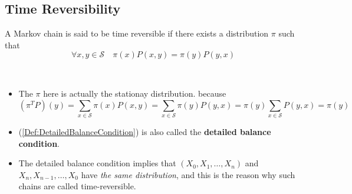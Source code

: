     \subsection{Time Reversibility}
        \begin{definition}
            A Markov chain is said to be time reversible if there exists a distribution $\pi$ such that
            \begin{equation}\label{Def:DetailedBalanceCondition}
                \forall x,y \in \mathcal{S} \quad \pi(x)P(x,y) = \pi(y)P(y,x)
            \end{equation}
        \end{definition}
        \begin{remark} ~{}
            \begin{itemize}
                \item The $\pi$ here is actually the stationay distribution. because
                \[ (\pi^TP)(y) = \sum_{x\in\mathcal{S}}\pi(x)P(x,y) = \sum_{x\in\mathcal{S}}\pi(y)P(y,x) = \pi(y)\sum_{x\in\mathcal{S}}P(y,x) = \pi(y) \]
                \item (\ref{Def:DetailedBalanceCondition}) is also called the \textbf{detailed balance condition}.
                \item The detailed balance condition implies that $(X_0,X_1,\dots,X_n)$ and $X_n,X_{n-1},\dots,X_0$ have \emph{the same distribution}, and this is the reason why such chains are called time-reversible.
            \end{itemize}
        \end{remark}


